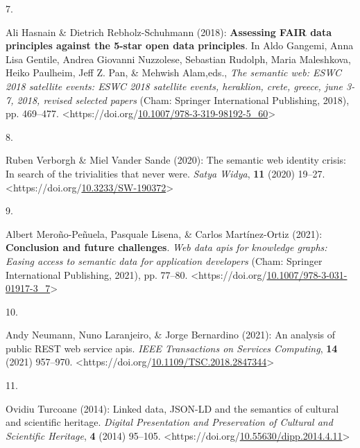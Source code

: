 \begin{thebibliography}{9}
\hypertarget{ref-hasnainAssessingFAIRData2018a}{}
7.

Ali Hasnain \& Dietrich Rebholz-Schuhmann (2018): \textbf{Assessing
{FAIR} data principles against the 5-star open data principles}. In Aldo
Gangemi, Anna Lisa Gentile, Andrea Giovanni Nuzzolese, Sebastian
Rudolph, Maria Maleshkova, Heiko Paulheim, Jeff Z. Pan, \& Mehwish
Alam,eds., \emph{The semantic web: {ESWC} 2018 satellite events: {ESWC}
2018 satellite events, heraklion, crete, greece, june 3-7, 2018, revised
selected papers} ({Cham}: {Springer International Publishing}, 2018),
pp. 469--477.
\textless https://doi.org/\href{https://doi.org/10.1007/978-3-319-98192-5_60}{10.1007/978-3-319-98192-5\_60}\textgreater{}

\hypertarget{ref-verborghSemanticWebIdentity2020a}{}
8.

Ruben Verborgh \& Miel Vander Sande (2020): The semantic web identity
crisis: {In} search of the trivialities that never were. \emph{Satya
Widya}, \textbf{11} (2020) 19--27.
\textless https://doi.org/\href{https://doi.org/10.3233/SW-190372}{10.3233/SW-190372}\textgreater{}

\hypertarget{ref-merono-penuelaConclusionFutureChallenges2021a}{}
9.

Albert Meroño-Peñuela, Pasquale Lisena, \& Carlos Martínez-Ortiz (2021):
\textbf{Conclusion and future challenges}. \emph{Web data apis for
knowledge graphs: {Easing} access to semantic data for application
developers} ({Cham}: {Springer International Publishing}, 2021), pp.
77--80.
\textless https://doi.org/\href{https://doi.org/10.1007/978-3-031-01917-3_7}{10.1007/978-3-031-01917-3\_7}\textgreater{}

\hypertarget{ref-neumannAnalysisPublicREST2021a}{}
10.

Andy Neumann, Nuno Laranjeiro, \& Jorge Bernardino (2021): An analysis
of public {REST} web service apis. \emph{IEEE Transactions on Services
Computing}, \textbf{14} (2021) 957--970.
\textless https://doi.org/\href{https://doi.org/10.1109/TSC.2018.2847344}{10.1109/TSC.2018.2847344}\textgreater{}

\hypertarget{ref-turcoaneLinkedDataJSONLD2014a}{}
11.

Ovidiu Turcoane (2014): Linked data, {JSON-LD} and the semantics of
cultural and scientific heritage. \emph{Digital Presentation and
Preservation of Cultural and Scientific Heritage}, \textbf{4} (2014)
95--105.
\textless https://doi.org/\href{https://doi.org/10.55630/dipp.2014.4.11}{10.55630/dipp.2014.4.11}\textgreater{}


\end{thebibliography}

